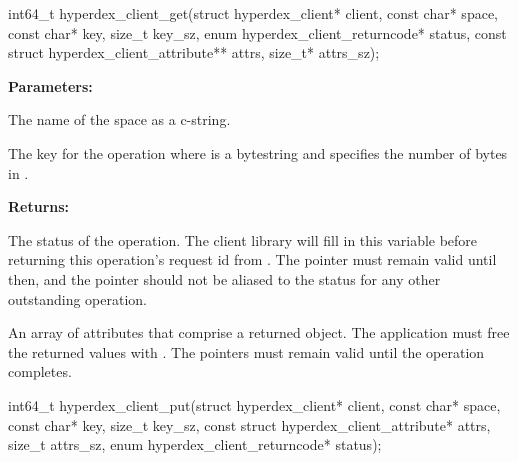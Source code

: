 
\begin{ccode}
int64_t hyperdex_client_get(struct hyperdex_client* client,
                const char* space,
                const char* key, size_t key_sz,
                enum hyperdex_client_returncode* status,
                const struct hyperdex_client_attribute** attrs, size_t* attrs_sz);
\end{ccode}
\funcdesc 

\noindent\textbf{Parameters:}
\begin{description}[labelindent=\widthof{{\code{key}, \code{key\_sz}}},leftmargin=*,noitemsep,nolistsep,align=right]
\item[\code{space}] The name of the space as a c-string.
\item[\code{key}, \code{key\_sz}] The key for the operation where  is a bytestring and  specifies the number of bytes in .
\end{description}

\noindent\textbf{Returns:}
\begin{description}[labelindent=\widthof{{\code{attrs}, \code{attrs\_sz}}},leftmargin=*,noitemsep,nolistsep,align=right]
\item[\code{status}] The status of the operation.  The client library will fill in this variable before returning this operation's request id from .  The pointer must remain valid until then, and the pointer should not be aliased to the status for any other outstanding operation.
\item[\code{attrs}, \code{attrs\_sz}] An array of attributes that comprise a returned object.  The application must free the returned values with .  The pointers must remain valid until the operation completes.
\end{description}

\funcsep
{}
\begin{ccode}
int64_t hyperdex_client_put(struct hyperdex_client* client,
                const char* space,
                const char* key, size_t key_sz,
                const struct hyperdex_client_attribute* attrs, size_t attrs_sz,
                enum hyperdex_client_returncode* status);
\end{ccode}
\funcdesc 

